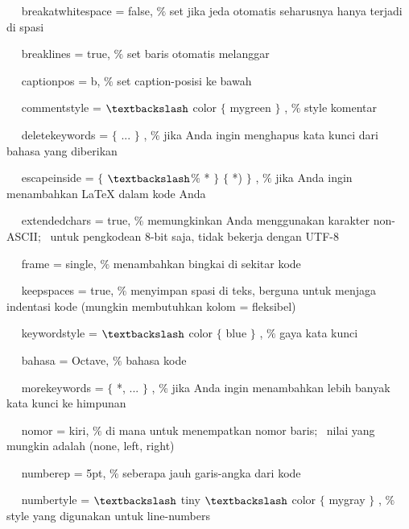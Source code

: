 ~~ breakatwhitespace = false, $\%$ set jika jeda otomatis seharusnya hanya terjadi di spasi\par

~~ breaklines = true, $\%$ set baris otomatis melanggar\par

~~ captionpos = b, $\%$ set caption-posisi ke bawah\par

~~ commentstyle = $\textbackslash$ color $ \{ $ mygreen $ \} $ , $\%$ style komentar\par

~~ deletekeywords = $ \{ $ ... $ \} $ , $\%$ jika Anda ingin menghapus kata kunci dari bahasa yang diberikan\par

~~ escapeinside = $ \{ $ $\textbackslash$$\%$ * $ \} $ $ \{ $ *) $ \} $ , $\%$ jika Anda ingin menambahkan LaTeX dalam kode Anda\par

~~ extendedchars = true, $\%$ memungkinkan Anda menggunakan karakter non-ASCII;~ untuk pengkodean 8-bit saja, tidak bekerja dengan UTF-8\par

~~ frame = single, $\%$ menambahkan bingkai di sekitar kode\par

~~ keepspaces = true, $\%$ menyimpan spasi di teks, berguna untuk menjaga indentasi kode (mungkin membutuhkan kolom = fleksibel)\par

~~ keywordstyle = $\textbackslash$ color $ \{ $ blue $ \} $ , $\%$ gaya kata kunci\par

~~ bahasa = Octave, $\%$ bahasa kode\par

~~ morekeywords = $ \{ $ *, ... $ \} $ , $\%$ jika Anda ingin menambahkan lebih banyak kata kunci ke himpunan\par

~~ nomor = kiri, $\%$ di mana untuk menempatkan nomor baris;~ nilai yang mungkin adalah (none, left, right)\par

~~ numberep = 5pt, $\%$ seberapa jauh garis-angka dari kode\par

~~ numbertyle = $\textbackslash$ tiny $\textbackslash$ color $ \{ $ mygray $ \} $ , $\%$ style yang digunakan untuk line-numbers\par

